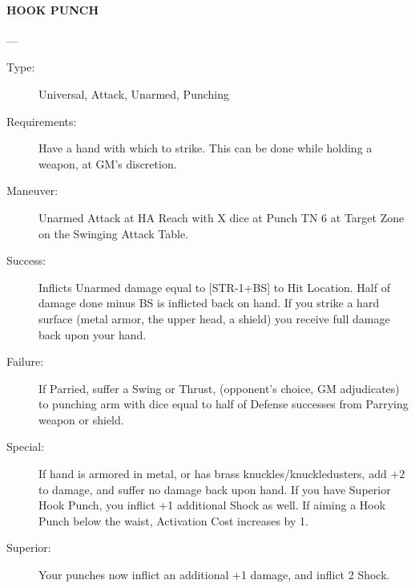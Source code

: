 \documentclass[oneside,11pt,english]{book}
\begin{document}
\paragraph{\large\label{man:HOOK PUNCH} HOOK PUNCH}---\quad{\large[X]}
\vspace{-10pt}\begin{description} 
\item [Type:] Universal, Attack, Unarmed, Punching 
\item [Requirements:] Have a hand with which to strike. This can be done while holding a weapon, at GM's 
discretion. 
\item [Maneuver:] Unarmed Attack at HA Reach with X dice at Punch TN 6 at Target Zone on the Swinging 
Attack Table. 
\item [Success:] Inflicts Unarmed damage equal to [STR-1+BS] to Hit Location. Half of damage done minus BS 
is inflicted back on hand. If you strike a hard surface (metal armor, the upper head, a shield) you receive 
full damage back upon your hand. 
\item [Failure:] If Parried, suffer a Swing or Thrust, (opponent’s choice, GM adjudicates) to punching arm with 
dice equal to half of Defense successes from Parrying weapon or shield. 
\item [Special:] If hand is armored in metal, or has brass knuckles/knuckledusters, add +2 to damage, and suffer 
no damage back upon hand. If you have Superior Hook Punch, you inflict +1 additional Shock as well. 
If aiming a Hook Punch below the waist, Activation Cost increases by 1. 
\item [Superior:] Your punches now inflict an additional +1 damage, and inflict 2 Shock. 
\end{description}
\end{document}

